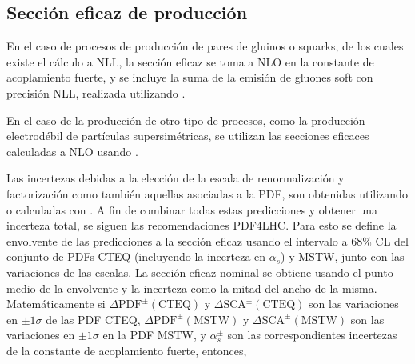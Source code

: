 \subsection{Sección eficaz de producción}
\label{sec:xs_calc}


En el caso de procesos de producción de pares de gluinos o squarks, de los cuales
existe el cálculo a NLL, la sección eficaz se toma a NLO en la constante de acoplamiento
fuerte, y se incluye la suma de la emisión de gluones soft con precisión NLL,
realizada utilizando {\nllfast}\cite{Kramer:2012bx,Beenakker:1996ch,Kulesza:2008jb,Kulesza:2009kq,Beenakker:2009ha,Beenakker:2011fu}.

En el caso de la producción de otro tipo de procesos, como la producción electrodébil de
partículas supersimétricas, se utilizan
las secciones eficaces calculadas a NLO usando {\prospino} \cite{Beenakker:1996ed}.


\newcommand{\pdfcteqpm}{\ensuremath{\Delta\mathrm{PDF}^{\pm}(\mathrm{CTEQ})}}
\newcommand{\scacteqpm}{\ensuremath{\Delta\mathrm{SCA}^{\pm}(\mathrm{CTEQ})}}

\newcommand{\pdfmstwpm}{\ensuremath{\Delta\mathrm{PDF}^{\pm}(\mathrm{MSTW})}}
\newcommand{\scamstwpm}{\ensuremath{\Delta\mathrm{SCA}^{\pm}(\mathrm{MSTW})}}

\newcommand{\alphap}{\ensuremath{\alpha_s_+}}
\newcommand{\alpham}{\ensuremath{\alpha_s^-}}
\newcommand{\alphapm}{\ensuremath{\alpha_s^{\pm}}}

Las incertezas debidas a la elección de la escala de renormalización y
factorización como también aquellas asociadas a la PDF, son obtenidas utilizando {\nllfast} o
calculadas con {\prospino}. A fin de combinar todas estas predicciones y obtener
una incerteza total, se siguen las recomendaciones PDF4LHC\cite{Botje:2011sn}.
Para esto se define la envolvente de las predicciones a la sección eficaz usando
el intervalo a 68\% CL del conjunto de PDFs CTEQ (incluyendo la incerteza en
$\alpha_s$) y MSTW, junto con las variaciones de las escalas. La sección eficaz
nominal se obtiene usando el punto medio de la envolvente y la incerteza como la
mitad del ancho de la misma. Matemáticamente si {\pdfcteqpm} y {\scacteqpm} son
las variaciones en $\pm 1\sigma$ de las PDF CTEQ,  {\pdfmstwpm} y {\scamstwpm}
son las variaciones en $\pm 1\sigma$ en la PDF MSTW, y {\alphapm} son las
correspondientes incertezas de la constante de acoplamiento fuerte, entonces,

